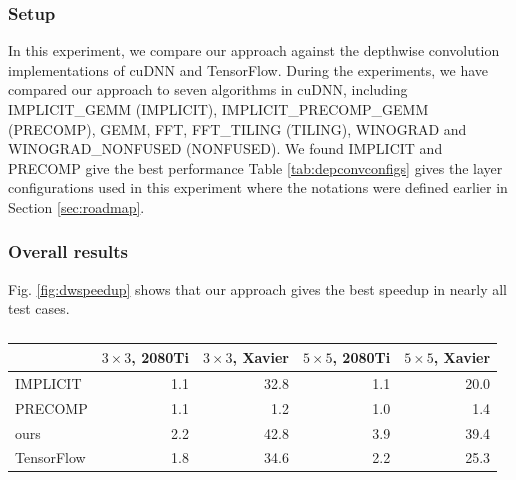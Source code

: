 \subsubsection{Setup} In this experiment, we compare our approach against the depthwise convolution implementations of cuDNN and TensorFlow.
During the experiments, we have compared our approach to seven algorithms in cuDNN, including IMPLICIT\_GEMM (IMPLICIT), IMPLICIT\_PRECOMP\_GEMM (PRECOMP), GEMM, FFT, FFT\_TILING (TILING), WINOGRAD and WINOGRAD\_NONFUSED (NONFUSED). We found IMPLICIT and PRECOMP give the best performance  Table \ref{tab:depconvconfigs} gives the layer configurations used in this experiment where the notations were defined earlier in Section \ref{sec:roadmap}.


\subsubsection{Overall results}
 Fig. \ref{fig:dwspeedup} shows that our approach gives the best speedup in nearly all test cases. 
 
\begin{table}[]
\setlength{\tabcolsep}{2.3pt}
\caption{}
\vspace{-3mm}
\label{tab:dwspeedups}
\centering
{}
\begin{threeparttable}
\begin{tabular}{l|r|r|r|r}
\toprule
& $3 \times 3$, 2080Ti & $3 \times 3$, Xavier &$5 \times 5$, 2080Ti&$5 \times 5$, Xavier\\
\midrule
IMPLICIT & 1.1 & 32.8 & 1.1 & 20.0\\
PRECOMP & 1.1 & 1.2 & 1.0 & 1.4\\
ours & 2.2 & 42.8 & 3.9 &39.4 \\
TensorFlow & 1.8 & 34.6 & 2.2 & 25.3\\

\bottomrule
\end{tabular}
\end{threeparttable}
\end{table}

